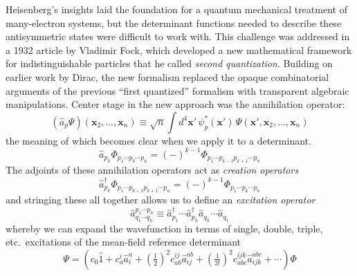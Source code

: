 Heisenberg's insights laid the foundation for a quantum mechanical treatment of
many-electron systems,\cite{Heisenberg:1926p411} but the determinant functions
needed to describe these antisymmetric states were difficult to work with.
This challenge was addressed in a 1932 article by Vladimir Fock, which developed
a new mathematical framework for indistinguishable particles that he called
{\itshape second quantization}.\cite{Fock:1932p622}
Building on earlier work by Dirac,\cite{Dirac:1927p243} the new formalism
replaced the opaque combinatorial arguments of the previous ``first quantized''
formalism with transparent algebraic manipulations.
Center stage in the new approach was the annihilation operator:
\begin{equation}
    (\hat{a}_p\Psi)(\mathbf{x}_2, \ldots, \mathbf{x}_n)
    \equiv
    \sqrt{n}
    \int
    d^4\mathbf{x}'\,
    \psi_p^*(\mathbf{x}')\,
    \Psi(\mathbf{x}', \mathbf{x}_2, \ldots, \mathbf{x}_n)
\end{equation}
the meaning of which becomes clear when we apply it to a determinant.
\begin{equation}
    \hat{a}_{p_k}
    \Phi_{p_1\cdots p_k \cdots p_n}
    =
    (-)^{k-1}
    \Phi_{p_1\cdots p_{k-1} p_{k+1}\cdots p_n}
\end{equation}
The adjoints of these annihilation operators act as {\itshape creation
operators}
\begin{equation}
    \hat{a}_{p_k}^\dagger
    \Phi_{p_1\cdots p_{k-1} p_{k+1}\cdots p_n}
    =
    (-)^{k-1}
    \Phi_{p_1\cdots p_k\cdots p_n}
\end{equation}
and stringing these all together allows us to define an {\itshape excitation
operator}
\begin{equation}
    \hat{a}^{p_1\cdots p_h}_{q_1\cdots q_h}
    \equiv
    \hat{a}_{p_1}^\dagger
    \cdots
    \hat{a}_{p_h}^\dagger
    \hat{a}_{q_h}
    \cdots
    \hat{a}_{q_1}
\end{equation}
whereby we can expand the wavefunction in terms of single, double, triple, etc.\
excitations of the mean-field reference determinant
\begin{equation}
    \label{eq:intro-ci-expansion}
    \Psi
    =
    \left(
        c_0
        \hat{1}
        +
        c_a^i
        \hat{a}^a_i
        +
        (\tfrac{1}{2})^2
        c_{ab}^{ij}
        \hat{a}^{ab}_{ij}
        +
        (\tfrac{1}{3!})^2
        c_{abc}^{ijk}
        \hat{a}^{abc}_{ijk}
        +
        \cdots
    \right)
    \Phi
\end{equation}
